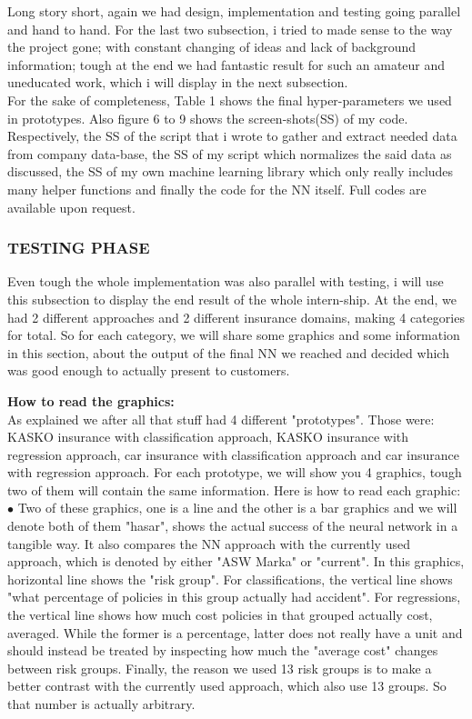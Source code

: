 \documentclass[titlepage, a4paper, 14pt]{extarticle} %
\begin{document}
Long story short, again we had design, implementation and testing going parallel and hand to hand. For the last two subsection, i tried to made sense to the way the project gone; with constant changing of ideas and lack of background information; tough at the end we had fantastic result for such an amateur and uneducated work, which i will display in the next subsection.\\

For the sake of completeness, Table 1 shows the final hyper-parameters we used in prototypes. Also figure 6 to 9 shows the screen-shots(SS) of my code. Respectively, the SS of the script that i wrote to gather and extract needed data from company data-base, the SS of my script which normalizes the said data as discussed, the SS of my own machine learning library which only really includes many helper functions and finally the code for the NN itself. Full codes are available upon request.

\subsubsection{TESTING PHASE} \label{testing}

Even tough the whole implementation was also parallel with testing, i will use this subsection to display the end result of the whole intern-ship. At the end, we had 2 different approaches and 2 different insurance domains, making 4 categories for total. So for each category, we will share some graphics and some information in this section, about the output of the final NN we reached and decided which was good enough to actually present to customers.

\textbf{How to read the graphics:} \\

As explained we after all that stuff had 4 different "prototypes". Those were: KASKO insurance with classification approach, KASKO insurance with regression approach, car insurance with classification approach and car insurance with regression approach. For each prototype, we will show you 4 graphics, tough two of them will contain the same information. Here is how to read each graphic:\\

$\bullet$ Two of these graphics, one is a line and the other is a bar graphics and we will denote both of them "hasar", shows the actual success of the neural network in a tangible way. It also compares the NN approach with the currently used approach, which is denoted by either "ASW Marka" or "current". In this graphics, horizontal line shows the "risk group". For classifications, the vertical line shows "what percentage of policies in this group actually had accident". For regressions, the vertical line shows how much cost policies in that grouped actually cost, averaged. While the former is a percentage, latter does not really have a unit and should instead be treated by inspecting how much the "average cost" changes between risk groups. Finally, the reason we used 13 risk groups is to make a better contrast with the currently used approach, which also use 13 groups. So that number is actually arbitrary.\\
\end{document}
